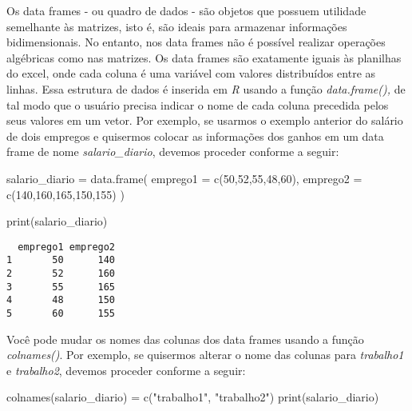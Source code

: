 \documentclass[
  letterpaper,
  DIV=11,
  numbers=noendperiod]{scrreprt}
\newenvironment{Shaded}{\begin{snugshade}}{\end{snugshade}}
\newcommand{\AttributeTok}[1]{\textcolor[rgb]{0.40,0.45,0.13}{#1}}
\newcommand{\DecValTok}[1]{\textcolor[rgb]{0.68,0.00,0.00}{#1}}
\newcommand{\FunctionTok}[1]{\textcolor[rgb]{0.28,0.35,0.67}{#1}}
\newcommand{\NormalTok}[1]{\textcolor[rgb]{0.00,0.23,0.31}{#1}}
\newcommand{\OtherTok}[1]{\textcolor[rgb]{0.00,0.23,0.31}{#1}}
\newcommand{\StringTok}[1]{\textcolor[rgb]{0.13,0.47,0.30}{#1}}
\begin{document}
Os data frames - ou quadro de dados - são objetos que possuem utilidade
semelhante às matrizes, isto é, são ideais para armazenar informações
bidimensionais. No entanto, nos data frames não é possível realizar
operações algébricas como nas matrizes. Os data frames são exatamente
iguais às planilhas do excel, onde cada coluna é uma variável com
valores distribuídos entre as linhas. Essa estrutura de dados é inserida
em \emph{R} usando a função \emph{data.frame(),} de tal modo que o
usuário precisa indicar o nome de cada coluna precedida pelos seus
valores em um vetor. Por exemplo, se usarmos o exemplo anterior do
salário de dois empregos e quisermos colocar as informações dos ganhos
em um data frame de nome \emph{salario\_diario}, devemos proceder
conforme a seguir:

\begin{Shaded}
\begin{Highlighting}[]
\NormalTok{salario\_diario }\OtherTok{=} \FunctionTok{data.frame}\NormalTok{(}
  \AttributeTok{emprego1 =} \FunctionTok{c}\NormalTok{(}\DecValTok{50}\NormalTok{,}\DecValTok{52}\NormalTok{,}\DecValTok{55}\NormalTok{,}\DecValTok{48}\NormalTok{,}\DecValTok{60}\NormalTok{),}
  \AttributeTok{emprego2 =} \FunctionTok{c}\NormalTok{(}\DecValTok{140}\NormalTok{,}\DecValTok{160}\NormalTok{,}\DecValTok{165}\NormalTok{,}\DecValTok{150}\NormalTok{,}\DecValTok{155}\NormalTok{)}
\NormalTok{)}

\FunctionTok{print}\NormalTok{(salario\_diario)}
\end{Highlighting}
\end{Shaded}

\begin{verbatim}
  emprego1 emprego2
1       50      140
2       52      160
3       55      165
4       48      150
5       60      155
\end{verbatim}

Você pode mudar os nomes das colunas dos data frames usando a função
\emph{colnames()}. Por exemplo, se quisermos alterar o nome das colunas
para \emph{trabalho1} e \emph{trabalho2}, devemos proceder conforme a
seguir:

\begin{Shaded}
\begin{Highlighting}[]
\FunctionTok{colnames}\NormalTok{(salario\_diario) }\OtherTok{=} \FunctionTok{c}\NormalTok{(}\StringTok{"trabalho1"}\NormalTok{, }\StringTok{"trabalho2"}\NormalTok{)}
\FunctionTok{print}\NormalTok{(salario\_diario)}
\end{Highlighting}
\end{Shaded}
\end{document}
